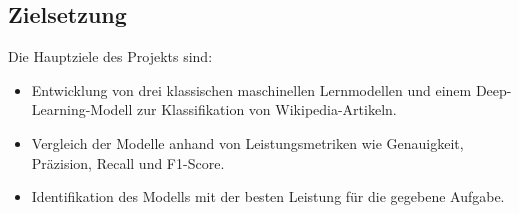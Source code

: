 \subsection{Zielsetzung}

Die Hauptziele des Projekts sind:

\begin{itemize} \item Entwicklung von drei klassischen maschinellen Lernmodellen und einem Deep-Learning-Modell zur Klassifikation von Wikipedia-Artikeln. \item Vergleich der Modelle anhand von Leistungsmetriken wie Genauigkeit, Präzision, Recall und F1-Score. \item Identifikation des Modells mit der besten Leistung für die gegebene Aufgabe. \end{itemize}